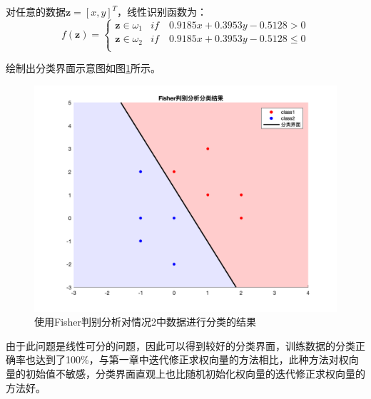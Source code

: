 \documentclass[cn]{elegantbook}
\begin{document}
对任意的数据$\mathbf{z}=[x,y]^T$，线性识别函数为：
\begin{equation}
f(\mathbf{z})=\left\{
\begin{array}{cc}
\mathbf{z}\in \omega_1 & if \quad 0.9185x + 0.3953y - 0.5128>0 \\
\mathbf{z}\in \omega_2 & if \quad 0.9185x + 0.3953y - 0.5128\le 0 \\
\end{array}
\right.
\end{equation}

绘制出分类界面示意图如图\ref{fig7}所示。

\begin{figure}[!h]
	\centering
	\includegraphics[width=\textwidth]{images/fisher2res1}
	\caption{\label{fig7}使用Fisher判别分析对情况2中数据进行分类的结果}
\end{figure}

由于此问题是线性可分的问题，因此可以得到较好的分类界面，训练数据的分类正确率也达到了100\%，与第一章中迭代修正求权向量的方法相比，此种方法对权向量的初始值不敏感，分类界面直观上也比随机初始化权向量的迭代修正求权向量的方法好。
\end{document}

